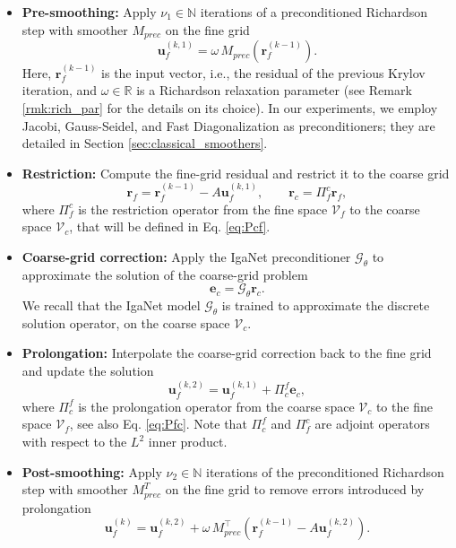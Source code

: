 \documentclass{article}
\newcommand{\R}{\mathbb{R}}
\newcommand{\N}{\mathbb{N}}
\theoremstyle{plain}
\numberwithin{equation}{section}
\begin{document}
\begin{itemize}
    \item \textbf{Pre-smoothing:} Apply $\nu_1\in \N$ iterations of a preconditioned Richardson step with smoother $M_{prec}$ on the fine grid
          \begin{equation*}
              \mathbf{u}_f^{(k,1)} = \omega \, M_{prec} (\mathbf{r}_f^{(k-1)}).
          \end{equation*}
          Here, $\mathbf{r}_f^{(k-1)}$ is the input vector, i.e., the residual of the previous Krylov iteration, and $\omega \in \R$ is a Richardson relaxation parameter (see Remark \ref{rmk:rich_par} for the details on its choice). In our experiments, we employ Jacobi, Gauss-Seidel, and Fast Diagonalization \cite{Lynch1964} as preconditioners; they are detailed in Section \ref{sec:classical_smoothers}.

    \item \textbf{Restriction:} Compute the fine-grid residual and restrict it to the coarse grid
          \begin{equation}
              \mathbf{r}_f = \mathbf{r}_f^{(k-1)} - A \mathbf{u}_f^{(k,1)}, \qquad \mathbf{r}_c = \Pi_f^c \mathbf{r}_f,
              \label{eq:restriction}
          \end{equation}
          where $\Pi_f^c$ is the restriction operator from the fine space $\mathcal{V}_f$ to the coarse space $\mathcal{V}_{c}$, that will be defined in Eq. \eqref{eq:Pcf}.

    \item \textbf{Coarse-grid correction:} Apply the IgaNet preconditioner $\mathcal{G}_{\theta}$ to approximate the solution of the coarse-grid problem
          \begin{equation*}
              \mathbf{e}_c = \mathcal{G}_{\theta}\mathbf{r}_c.
          \end{equation*}
          We recall that the IgaNet model $\mathcal{G}_{\theta}$ is trained to approximate the discrete solution operator, on the coarse space $\mathcal{V}_{c}$.

    \item \textbf{Prolongation:} Interpolate the coarse-grid correction back to the fine grid and update the solution
          \begin{equation}
              \mathbf{u}_f^{(k,2)} = \mathbf{u}_f^{(k,1)} + \Pi_c^f \mathbf{e}_c,
              \label{eq:prolongation}
          \end{equation}
          where $\Pi_c^f$ is the prolongation operator from the coarse space $\mathcal{V}_{c}$ to the fine space $\mathcal{V}_f$, see also Eq. \eqref{eq:Pfc}. Note that $\Pi_c^f$ and $\Pi_f^c$ are adjoint operators with respect to the $L^2$ inner product.

    \item \textbf{Post-smoothing:} Apply $\nu_2\in \N$ iterations of the preconditioned Richardson step with smoother $M_{prec}^T$ on the fine grid to remove errors introduced by prolongation
          \begin{equation*}
              \mathbf{u}_f^{(k)} = \mathbf{u}_f^{(k,2)} + \omega \, M_{prec}^{\top} (\mathbf{r}_f^{(k-1)} - A \mathbf{u}_f^{(k,2)}).
          \end{equation*}
\end{itemize}
\end{document}
